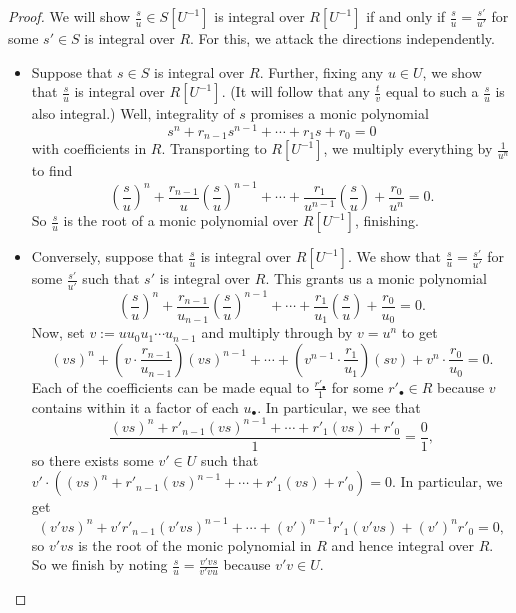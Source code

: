 \begin{proof}
	We will show $\frac su\in S\left[U^{-1}\right]$ is integral over $R\left[U^{-1}\right]$ if and only if $\frac su=\frac{s'}{u'}$ for some $s'\in S$ is integral over $R$. For this, we attack the directions independently.
	\begin{itemize}
		\item Suppose that $s\in S$ is integral over $R$. Further, fixing any $u\in U$, we show that $\frac su$ is integral over $R\left[U^{-1}\right]$. (It will follow that any $\frac tv$ equal to such a $\frac su$ is also integral.) Well, integrality of $s$ promises a monic polynomial
		\[s^n+r_{n-1}s^{n-1}+\cdots+r_1s+r_0=0\]
		with coefficients in $R$. Transporting to $R\left[U^{-1}\right]$, we multiply everything by $\frac1{u^n}$ to find
		\[\left(\frac su\right)^n+\frac{r_{n-1}}u\left(\frac su\right)^{n-1}+\cdots+\frac{r_1}{u^{n-1}}\left(\frac su\right)+\frac{r_0}{u^n}=0.\]
		So $\frac su$ is the root of a monic polynomial over $R\left[U^{-1}\right]$, finishing.
		\item Conversely, suppose that $\frac su$ is integral over $R\left[U^{-1}\right]$. We show that $\frac su=\frac{s'}{u'}$ for some $\frac{s'}{u'}$ such that $s'$ is integral over $R$. This grants us a monic polynomial
		\[\left(\frac su\right)^n+\frac{r_{n-1}}{u_{n-1}}\left(\frac su\right)^{n-1}+\cdots+\frac{r_1}{u_1}\left(\frac su\right)+\frac{r_0}{u_0}=0.\]
		Now, set $v:=uu_0u_1\cdots u_{n-1}$ and multiply through by $v=u^n$ to get
		\[(vs)^n+\left(v\cdot\frac{r_{n-1}}{u_{n-1}}\right)(vs)^{n-1}+\cdots+\left(v^{n-1}\cdot\frac{r_1}{u_1}\right)(sv)+v^n\cdot\frac{r_0}{u_0}=0.\]
		Each of the coefficients can be made equal to $\frac{r'_\bullet}1$ for some $r'_\bullet\in R$ because $v$ contains within it a factor of each $u_\bullet$. In particular, we see that
		\[\frac{(vs)^n+r'_{n-1}(vs)^{n-1}+\cdots+r'_1(vs)+r'_0}1=\frac01,\]
		so there exists some $v'\in U$ such that $v'\cdot\left((vs)^n+r'_{n-1}(vs)^{n-1}+\cdots+r'_1(vs)+r'_0\right)=0$. In particular, we get
		\[(v'vs)^n+v'r'_{n-1}(v'vs)^{n-1}+\cdots+(v')^{n-1}r'_1(v'vs)+(v')^nr'_0=0,\]
		so $v'vs$ is the root of the monic polynomial in $R$ and hence integral over $R$. So we finish by noting $\frac su=\frac{v'vs}{v'vu}$ because $v'v\in U$.
		\qedhere
	\end{itemize}
\end{proof}


